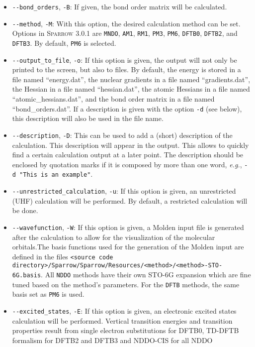 \documentclass[]{tufte-book}
\begin{document}
\begin{itemize}
\item \texttt{-{}-bond\_orders}, \texttt{-B}: If given, the bond order matrix will be calculated.
\item \texttt{-{}-method}, \texttt{-M}: With this option, the desired calculation method can be set. Options in
\textsc{Sparrow} 3.0.1 are \texttt{MNDO}, \texttt{AM1}, \texttt{RM1}, \texttt{PM3}, \texttt{PM6}, \texttt{DFTB0}, \texttt{DFTB2}, and
\texttt{DFTB3}. By default, \texttt{PM6} is selected.
\item \texttt{-{}-output\_to\_file}, \texttt{-o}: If this option is given, the output will not only be printed to the screen, 
but also to files. By default, the energy is stored in a file named ``energy.dat'', the nuclear gradients in a file named
``gradients.dat'', the Hessian in a file named ``hessian.dat'', the atomic Hessians in a file named ``atomic\_hessians.dat'', and the
bond order matrix in a file named ``bond\_orders.dat''.
If a description is given with the option \texttt{-d} (see below), this description will also be used in the file name.
\item \texttt{-{}-description}, \texttt{-D}: This can be used to add a (short) description of the calculation. This
description will appear in the output. This allows to quickly find a certain calculation output at a later point. The
description should be enclosed by quotation marks if it is composed by more than one word, \textit{e.g.},
\texttt{-d "This is an example"}.
\item \texttt{-{}-unrestricted\_calculation}, \texttt{-u}: If this option is given, an unrestricted (UHF) calculation
will be performed. By default, a restricted calculation will be done.
\item \texttt{-{}-wavefunction}, \texttt{-W}: If this option is given, a Molden input file is generated after the
calculation to allow for the visualization of the molecular orbitals.The basis functions used for the generation of the
Molden input are defined in the files \texttt{<source code directory>/Sparrow/Sparrow/Resources/<method>/<method>-STO-6G.basis}.
All \texttt{NDDO} methods have their own STO-6G expansion which are fine tuned based on the method's parameters.
For the \texttt{DFTB} methods, the same basis set as \texttt{PM6} is used.
\item \texttt{-{}-excited\_states}, \texttt{-E}: If this option is given, an
  electronic excited states calculation will be performed. Vertical transition
    energies and transition properties result from single electron substitutions
    for DFTB0, TD-DFTB formalism for DFTB2 and DFTB3 and NDDO-CIS for all NDDO

\end{itemize}
\end{document}

